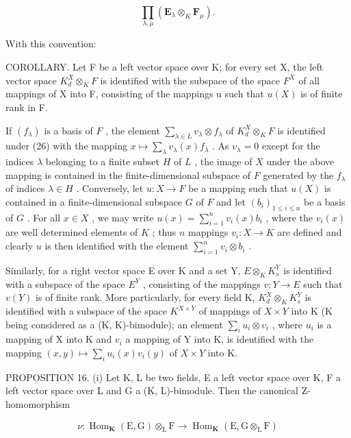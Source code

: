 \[
\prod_ {\lambda , \mu} (\mathbf {E} _ {\lambda} \otimes_ {K} \mathbf {F} _ {\mu}).
\]

With this convention:

COROLLARY. Let F be a left vector space over K; for every set X, the left vector space \(K_{d}^{X} \otimes_{K} F\) is identified with the subspace of the space \(F^{X}\) of all mappings of X into F, consisting of the mappings u such that \(u(X)\) is of finite rank in F.

If \((f_{\lambda})\) is a basis of \(F\) , the element \(\sum_{\lambda \in L} v_{\lambda} \otimes f_{\lambda}\) of \(K_d^X \otimes_K F\) is identified under (26) with the mapping \(x \mapsto \sum_{\lambda} v_{\lambda}(x)f_{\lambda}\) . As \(v_{\lambda} = 0\) except for the indices \(\lambda\) belonging to a finite subset \(H\) of \(L\) , the image of \(X\) under the above mapping is contained in the finite-dimensional subspace of \(F\) generated by the \(f_{\lambda}\) of indices \(\lambda \in H\) . Conversely, let \(u: X \to F\) be a mapping such that \(u(X)\) is contained in a finite-dimensional subspace \(G\) of \(F\) and let \((b_i)_{1 \leqslant i \leqslant n}\) be a basis of \(G\) . For all \(x \in X\) , we may write \(u(x) = \sum_{i=1}^{n} v_i(x)b_i\) , where the \(v_i(x)\) are well determined elements of \(K\) ; thus \(n\) mappings \(v_i: X \to K\) are defined and clearly \(u\) is then identified with the element \(\sum_{i=1}^{n} v_i \otimes b_i\) .

Similarly, for a right vector space E over K and a set Y, \(E \otimes_{K} K_{s}^{Y}\) is identified with a subspace of the space \(E^{Y}\) , consisting of the mappings \(v: Y \to E\) such that \(v(Y)\) is of finite rank. More particularly, for every field K, \(K_{d}^{X} \otimes_{K} K_{s}^{Y}\) is identified with a subspace of the space \(K^{X \times Y}\) of mappings of \(X \times Y\) into K (K being considered as a (K, K)-bimodule); an element \(\sum_{i} u_{i} \otimes v_{i}\) , where \(u_{i}\) is a mapping of X into K and \(v_{i}\) a mapping of Y into K, is identified with the mapping \((x, y) \mapsto \sum_{i} u_{i}(x) v_{i}(y)\) of \(X \times Y\) into K.

PROPOSITION 16. (i) Let K, L be two fields, E a left vector space over K, F a left vector space over L and G a (K, L)-bimodule. Then the canonical Z-homomorphism

\[
\nu : \operatorname{Hom} _ {\mathbf {K}} (\mathrm{E}, \mathrm{G}) \otimes_ {\mathrm{L}} \mathrm{F} \rightarrow \operatorname{Hom} _ {\mathbf {K}} (\mathrm{E}, \mathrm{G} \otimes_ {\mathrm{L}} \mathrm{F})\tag{27}
\]

